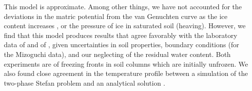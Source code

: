 \documentclass[twoside,10pt]{report}
\begin{document}
This model is approximate. Among other things, we have not accounted for the deviations in the  matric potential from the van Genuchten curve as the ice content increases \citep{KurylykWatanabe2013, WatanabeExperiment}, or the pressure of ice in saturated soil (heaving). However, we find that this model produces results that agree favorably with the laboratory data of \citet{Mizoguchi1990} and of \citet{WatanabeExperiment}, given uncertainties in soil properties, boundary conditions (for the Mizoguchi data), and our neglecting of the residual water content. Both experiments are of freezing fronts in soil columns which are initially unfrozen. We also found close agreement in the temperature profile between a simulation of the two-phase Stefan problem and an analytical solution \citep{dallamico2011}.
\end{document}
